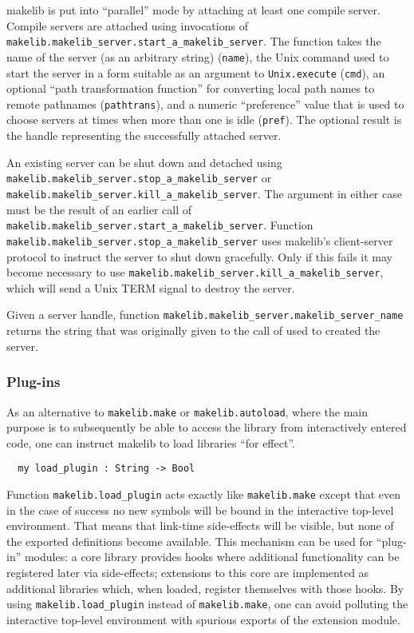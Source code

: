 makelib is put into ``parallel'' mode by attaching at least one compile
server.  Compile servers are attached using invocations of {\tt
makelib.makelib_server.start_a_makelib_server}.  The function takes the
name of the server (as an arbitrary string) ({\tt name}),
the Unix command used to start the server in a form suitable
as an argument to {\tt Unix.execute} ({\tt cmd}), an optional
``path transformation function'' for converting local path names
to remote pathnames ({\tt pathtrans}), and a numeric ``preference''
value that is used to choose servers at times when more than one
is idle ({\tt pref}).  The optional result is the handle representing
the successfully attached server.

An existing server can be shut down and detached using {\tt
makelib.makelib_server.stop_a_makelib_server} or {\tt makelib.makelib_server.kill_a_makelib_server}.
The argument in either case must be the result of an earlier call
of {\tt makelib.makelib_server.start_a_makelib_server}.
Function {\tt makelib.makelib_server.stop_a_makelib_server} uses makelib's
client-server protocol to instruct the server to shut down gracefully.
Only if this fails it may become necessary to use {\tt makelib.makelib_server.kill_a_makelib_server},
which will send a Unix TERM signal to destroy the server.

Given a server handle, function {\tt makelib.makelib_server.makelib_server_name}
returns the string that was originally given to the call of used to created the server.

\subsubsection{Plug-ins}

As an alternative to {\tt makelib.make} or {\tt makelib.autoload}, where the
main purpose is to subsequently be able to access the library from
interactively entered code, one can instruct makelib to load libraries
``for effect''.

\begin{verbatim}
  my load_plugin : String -> Bool
\end{verbatim}

Function {\tt makelib.load\_plugin} acts exactly like {\tt makelib.make} except
that even in the case of success no new symbols will be bound in the
interactive top-level environment.  That means that link-time
side-effects will be visible, but none of the exported definitions
become available.  This mechanism can be used for ``plug-in'' modules:
a core library provides hooks where additional functionality can be
registered later via side-effects; extensions to this core are
implemented as additional libraries which, when loaded, register
themselves with those hooks.  By using {\tt makelib.load\_plugin} instead
of {\tt makelib.make}, one can avoid polluting the interactive top-level
environment with spurious exports of the extension module.

